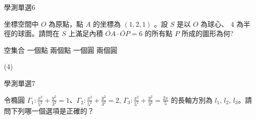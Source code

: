 \begin{QUESTIONS}
\begin{QUESTION}
        \begin{QSOLLIST}
        \end{QSOLLIST}
        \begin{QEMPTYSPACE}
        \end{QEMPTYSPACE}
    \end{QUESTION}
    \begin{QUESTION}
        \begin{ExamInfo}{99}{學測}{單選}{6}
        \end{ExamInfo}
        \begin{ExamAnsRateInfo}{49}{70}{53}{24}
        \end{ExamAnsRateInfo}
        \begin{QBODY}
            坐標空間中 $O$ 為原點，點 $A$ 的坐標為  $(1,2,1)$ 。設 $S$ 是以  $O$ 為球心、 $4$ 為半徑的球面。請問在 $S$ 上滿足內積 $\lvec{OA} \cdot \lvec{ OP} = 6$ 的所有點 $P$ 所成的圖形為何?
			\begin{QOPS} 
				\QOP 空集合 
				\QOP 一個點 
				\QOP 兩個點 
				\QOP 一個圓 
				\QOP 兩個圓 
			\end{QOPS}
        \end{QBODY}
        \begin{QFROMS}
        \end{QFROMS}
        \begin{QTAGS}\end{QTAGS}
        \begin{QANS}
            (4)
        \end{QANS}
        \begin{QSOLLIST}
        \end{QSOLLIST}
        \begin{QEMPTYSPACE}
        \end{QEMPTYSPACE}
    \end{QUESTION}
    \begin{QUESTION}
        \begin{ExamInfo}{99}{學測}{單選}{7}
        \end{ExamInfo}
        \begin{ExamAnsRateInfo}{33}{65}{22}{12}
        \end{ExamAnsRateInfo}
        \begin{QBODY}
            令橢圓 $\Gamma_1 : \frac{x^2}{5^2} + \frac{y^2}{3^2} =1$、$\Gamma_2 : \frac{x^2}{5^2} + \frac{y^2}{3^2} =2$, $\Gamma_3 : \frac{x^2}{5^2} + \frac{y^2}{3^2} =\frac{2x}{5}$ 的長軸方別為 $l_1$, $l_2$, $l_3$。請問下列哪一個選項是正確的？
			\begin{QOPS} 

\end{QOPS}
\end{QBODY}
\end{QUESTION}
\end{QUESTIONS}
